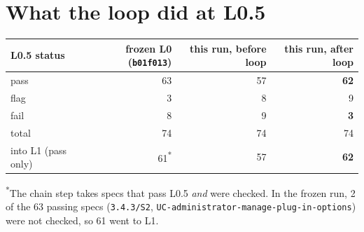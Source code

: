\documentclass[10pt,a4paper]{article}
\newcommand{\code}[1]{\texttt{\small #1}}
\begin{document}
\section{What the loop did at L0.5}
\begin{center}
\begin{tabular}{@{}lrrr@{}}
\toprule
L0.5 status & frozen L0 (\code{b01f013}) & this run, before loop & this run, after loop \\
\midrule
pass                       & 63 & 57 & \textbf{62} \\
flag                       & 3  & 8  & 9  \\
fail                       & 8  & 9  & \textbf{3} \\
\midrule
total                      & 74 & 74 & 74 \\
into L1 (pass only)        & 61\textsuperscript{*} & 57 & \textbf{62} \\
\bottomrule
\end{tabular}
\end{center}
{\footnotesize \textsuperscript{*}The chain step takes specs that pass L0.5 \emph{and} were checked. In the frozen run, 2 of the 63
passing specs (\code{3.4.3/S2}, \code{UC-administrator-manage-plug-in-options}) were not checked, so 61 went to L1.}
\end{document}
